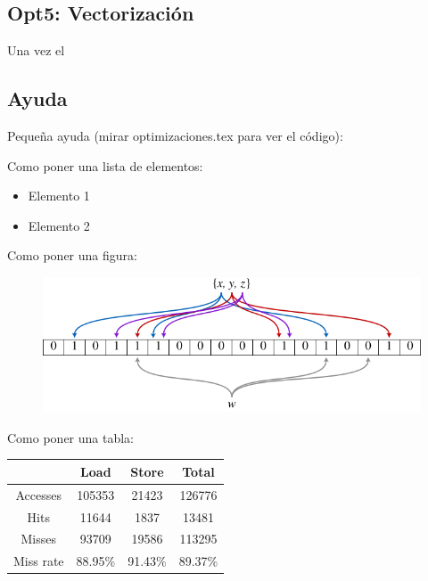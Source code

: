 \subsection{Opt5: Vectorizaci\'{o}n}

Una vez el 



\subsection{Ayuda}

Peque\~{n}a ayuda (mirar optimizaciones.tex para ver el c\'{o}digo):

Como poner una lista de elementos:
\begin{itemize}
   \item Elemento 1
   \item Elemento 2
\end{itemize}

Como poner una figura:
\begin{figure}[ht]
   \centering
   \includegraphics[keepaspectratio=true,width=.6\textwidth]{figures/muestra}
\end{figure}

Como poner una tabla:
\begin{center}
   \begin{tabular}{| c || c | c | c |}
      \hline
      	           & Load	& Store		& Total		\\ \hline \hline
	Accesses   & 105353	& 21423		& 126776	\\ \hline
	Hits       &  11644	&  1837		&  13481	\\ \hline
	Misses     &  93709 	& 19586		& 113295	\\ \hline
	Miss rate  & 88.95\%	& 91.43\%	& 89.37\%	\\ \hline
   \end{tabular}
\end{center}

